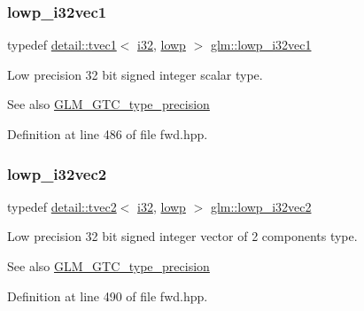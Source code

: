 \subsubsection{\texorpdfstring{lowp\+\_\+i32vec1}{lowp\_i32vec1}}
{\footnotesize\ttfamily typedef \hyperlink{structglm_1_1detail_1_1tvec1}{detail\+::tvec1}$<$ \hyperlink{group__gtc__type__precision_ga1d8ed5c43e91ea7d4528389da4fa9524}{i32}, \hyperlink{namespaceglm_a0f04f086094c747d227af4425893f545ae161af3fc695e696ce3bf69f7332bc2d}{lowp} $>$ \hyperlink{group__gtc__type__precision_gadb82f1c8a0f4d3304862d32079961974}{glm\+::lowp\+\_\+i32vec1}}

Low precision 32 bit signed integer scalar type. \begin{DoxySeeAlso}{See also}
\hyperlink{group__gtc__type__precision}{G\+L\+M\+\_\+\+G\+T\+C\+\_\+type\+\_\+precision} 
\end{DoxySeeAlso}


Definition at line 486 of file fwd.\+hpp.

\mbox{\label{group__gtc__type__precision_ga1ac855a9b4ef24908d00ab715e7ddbff}} 
\subsubsection{\texorpdfstring{lowp\+\_\+i32vec2}{lowp\_i32vec2}}
{\footnotesize\ttfamily typedef \hyperlink{structglm_1_1detail_1_1tvec2}{detail\+::tvec2}$<$ \hyperlink{group__gtc__type__precision_ga1d8ed5c43e91ea7d4528389da4fa9524}{i32}, \hyperlink{namespaceglm_a0f04f086094c747d227af4425893f545ae161af3fc695e696ce3bf69f7332bc2d}{lowp} $>$ \hyperlink{group__gtc__type__precision_ga1ac855a9b4ef24908d00ab715e7ddbff}{glm\+::lowp\+\_\+i32vec2}}

Low precision 32 bit signed integer vector of 2 components type. \begin{DoxySeeAlso}{See also}
\hyperlink{group__gtc__type__precision}{G\+L\+M\+\_\+\+G\+T\+C\+\_\+type\+\_\+precision} 
\end{DoxySeeAlso}


Definition at line 490 of file fwd.\+hpp.

\mbox{\label{group__gtc__type__precision_gaa4a0dd64d4253a3641225254670c7b95}} 
